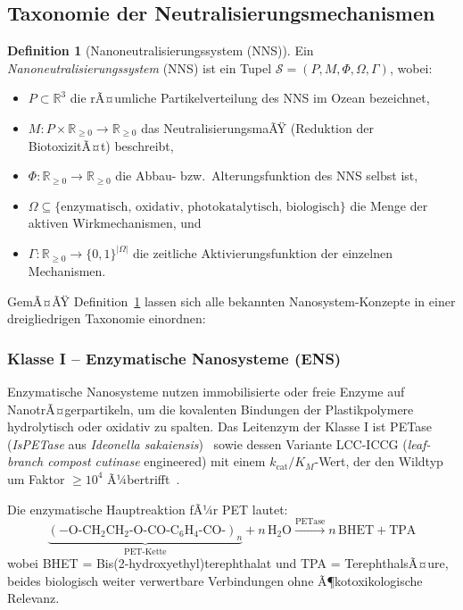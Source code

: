 ﻿\documentclass[12pt,a4paper]{article}
\theoremstyle{definition}
\newtheorem{definition}{Definition}[section]
\theoremstyle{remark}
\newcommand{\R}{\mathbb{R}}
\begin{document}
\subsection{Taxonomie der Neutralisierungsmechanismen}

\begin{definition}[Nanoneutralisierungssystem (NNS)]
\label{def:nns}
Ein \emph{Nanoneutralisierungssystem} (NNS) ist ein Tupel
$\mathcal{S} = (P, M, \Phi, \Omega, \Gamma)$, wobei:
\begin{itemize}
  \item $P \subset \R^3$ die rÃ¤umliche Partikelverteilung des NNS im Ozean bezeichnet,
  \item $M: P \times \R_{\geq 0} \to \R_{\geq 0}$ das NeutralisierungsmaÃŸ
        (Reduktion der BiotoxizitÃ¤t) beschreibt,
  \item $\Phi: \R_{\geq 0} \to \R_{\geq 0}$ die Abbau- bzw.\ Alterungsfunktion
        des NNS selbst ist,
  \item $\Omega \subseteq \{\text{enzymatisch, oxidativ, photokatalytisch, biologisch}\}$
        die Menge der aktiven Wirkmechanismen, und
  \item $\Gamma: \R_{\geq 0} \to \{0,1\}^{|\Omega|}$ die zeitliche Aktivierungsfunktion
        der einzelnen Mechanismen.
\end{itemize}
\end{definition}

GemÃ¤ÃŸ Definition~\ref{def:nns} lassen sich alle bekannten Nanosystem-Konzepte
in einer dreigliedrigen Taxonomie einordnen:

\subsubsection{Klasse I -- Enzymatische Nanosysteme (ENS)}

Enzymatische Nanosysteme nutzen immobilisierte oder freie Enzyme auf
NanotrÃ¤gerpartikeln, um die kovalenten Bindungen der Plastikpolymere hydrolytisch
oder oxidativ zu spalten. Das Leitenzym der Klasse I ist PETase
(\textit{IsPETase} aus \textit{Ideonella sakaiensis})~\cite{yoshida2016bacterium}
sowie dessen Variante LCC-ICCG (\textit{leaf-branch compost cutinase} engineered)
mit einem $k_{\text{cat}}/K_M$-Wert, der den Wildtyp um Faktor $\geq 10^4$
Ã¼bertrifft~\cite{tournier2020engineered}.

Die enzymatische Hauptreaktion fÃ¼r PET lautet:
\begin{equation}
  \underbrace{(-\text{O-CH}_2\text{CH}_2\text{-O-CO-C}_6\text{H}_4\text{-CO-})_n}_{\text{PET-Kette}}
  + n\,\text{H}_2\text{O}
  \xrightarrow{\text{PETase}}
  n\,\text{BHET} + \text{TPA}
  \label{eq:petase_reaction}
\end{equation}
wobei BHET = Bis(2-hydroxyethyl)terephthalat und TPA = TerephthalsÃ¤ure, beides
biologisch weiter verwertbare Verbindungen ohne Ã¶kotoxikologische Relevanz.
\end{document}
